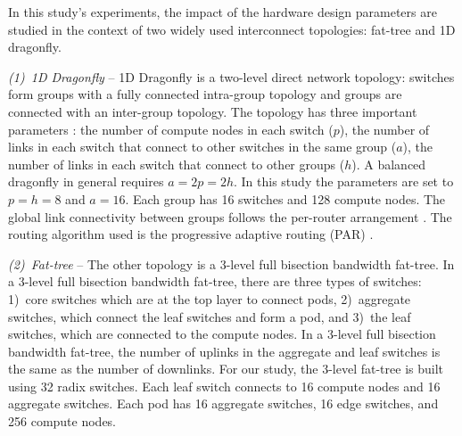 \label{sec:hardwareparameters}
\vspace{0.08in}
In this study's experiments, the impact of the hardware design parameters are studied in the context of two 
widely used interconnect topologies: fat-tree and 1D dragonfly.

{\em (1)~1D Dragonfly} -- 1D Dragonfly \cite{Kim2008ISCA}
is a two-level direct network topology: switches form groups with a fully connected
intra-group topology and groups are connected with an inter-group topology.
The topology has three important parameters \cite{Kim2008ISCA}:
the number of compute nodes in each switch ($p$),
the number of links in each switch that connect to other switches in the same group
($a$), the number of links in each switch that connect to other groups ($h$). A balanced dragonfly
in general requires $a = 2p = 2h$. In this study the parameters are set to $p = h = 8$ and $a = 16$.
Each group has 16 switches and 128 compute nodes. 
The global link connectivity between groups follows the per-router arrangement
\cite{Alzaid2020ICS}.
The routing algorithm used is the progressive adaptive routing (PAR) \cite{Kim2008ISCA,Alzaid2020ICS}.

{\em (2)~Fat-tree} -- The other topology is a 3-level full bisection bandwidth
fat-tree.  In a 3-level full bisection bandwidth fat-tree, there are three types
of switches: 1)~core switches which are at the top layer to connect pods,
2)~aggregate switches, which connect the leaf switches and form a pod, and
3)~the leaf switches, which are connected to the compute nodes. In a 3-level
full bisection bandwidth fat-tree, the number of uplinks in the aggregate and
leaf switches is the same as the number of downlinks. For our study, the 3-level
fat-tree is built using 32 radix switches. Each leaf switch connects to 16
compute nodes and 16 aggregate switches. Each pod has 16 aggregate switches, 16
edge switches, and 256 compute nodes.

